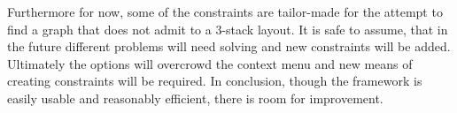 Furthermore for now, some of the constraints are tailor-made for the attempt to find a graph that does not admit to a 3-stack layout. It is safe to assume, that in the future different problems will need solving and new constraints will be added. Ultimately the options will overcrowd the context menu and new means of creating constraints will be required.
In conclusion, though the framework is easily usable and reasonably efficient, there is room for improvement.


